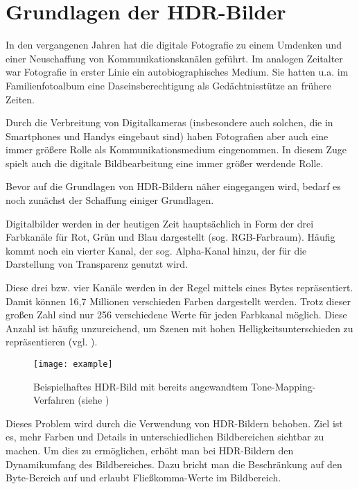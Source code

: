 
\chapter{Grundlagen der HDR-Bilder}
\label{chap:hdr}


In den vergangenen Jahren hat die digitale Fotografie zu einem Umdenken und einer Neuschaffung von Kommunikationskanälen geführt. Im analogen Zeitalter war Fotografie in erster Linie ein autobiographisches Medium.  Sie hatten u.a. im Familienfotoalbum eine Daseinsberechtigung als Gedächtnisstütze an frühere Zeiten.

Durch die Verbreitung von Digitalkameras (insbesondere auch solchen, die in Smartphones und Handys eingebaut sind) haben Fotografien aber auch eine immer größere Rolle als Kommunikationsmedium eingenommen. 
In diesem Zuge spielt auch die digitale Bildbearbeitung eine immer größer werdende Rolle. 

Bevor auf die Grundlagen von \gls{HDR}-Bildern näher eingegangen wird, bedarf es noch zunächst der Schaffung einiger Grundlagen.

Digitalbilder werden in der heutigen Zeit hauptsächlich in Form der drei Farbkanäle für Rot, Grün und Blau dargestellt (sog. \gls{RGB-Farbraum}). Häufig kommt noch ein vierter Kanal, der sog. Alpha-Kanal hinzu, der für die Darstellung von Transparenz genutzt wird. 

Diese drei bzw. vier Kanäle werden in der Regel mittels eines Bytes repräsentiert. Damit können 16,7 Millionen verschieden Farben dargestellt werden. Trotz dieser großen Zahl sind nur 256 verschiedene Werte für jeden Farbkanal möglich. Diese Anzahl ist häufig unzureichend, um Szenen mit hohen Helligkeitsunterschieden zu repräsentieren (vgl. \cite[S.~1f]{Reinhard}).


\begin{figure}[h]
  \begin{center}
    \texttt{[image: example]}
    \caption{Beispielhaftes \gls{HDR}-Bild mit bereits angewandtem \gls{Tone-Mapping}-Verfahren (siehe \cite{tellone}) }
    \label{fig:teezer}
  \end{center}
\end{figure}

Dieses Problem wird durch die Verwendung von \gls{HDR}-Bildern behoben. Ziel ist es, mehr Farben und Details in unterschiedlichen Bildbereichen sichtbar zu machen. Um dies zu ermöglichen, erhöht man bei \gls{HDR}-Bildern den \gls{Dynamikumfang} des Bildbereiches. Dazu bricht man die Beschränkung auf den Byte-Bereich auf und erlaubt Fließkomma-Werte im Bildbereich.


